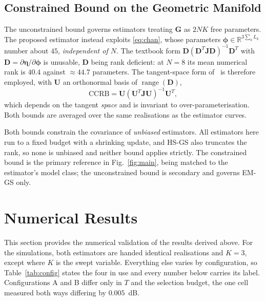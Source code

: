 \documentclass[journal]{IEEEtran}
\DeclareMathOperator{\range}{range}
\newcommand{\bG}{\mathbf{G}}
\newcommand{\bJ}{\mathbf{J}}
\newcommand{\bD}{\mathbf{D}}
\newcommand{\bU}{\mathbf{U}}
\begin{document}
\subsection{Constrained Bound on the Geometric Manifold}

The unconstrained bound governs estimators treating $\bG$ as $2NK$ free
parameters. The proposed estimator instead exploits \eqref{eq:chan}, whose
parameters $\boldsymbol\phi\in\mathbb{R}^{3\sum_k L_k}$ number about $45$,
\emph{independent of $N$}. The textbook form $\bD(\bD^T\bJ\bD)^{-1}\bD^T$ with
$\bD=\partial\boldsymbol\eta/\partial\boldsymbol\phi$ is unusable, $\bD$ being
rank deficient: at $N=8$ its mean numerical rank is $40.4$ against $\approx44.7$
parameters. The tangent-space form of~\cite{gorman1990,stoica1998} is therefore
employed, with $\bU$ an orthonormal basis of $\range(\bD)$,
\begin{equation}
\mathrm{CCRB}=\bU(\bU^T\bJ\bU)^{-1}\bU^T,
\label{eq:ccrb}
\end{equation}
which depends on the tangent \emph{space} and is invariant to
over-parameterisation. Both bounds are averaged over the same realisations as
the estimator curves.

Both bounds constrain the covariance of \emph{unbiased} estimators. All
estimators here run to a fixed budget with a shrinking update, and HS-GS also
truncates the rank, so none is unbiased and neither bound applies strictly. The
constrained bound is the primary reference in Fig.~\ref{fig:main}, being matched
to the estimator's model class; the unconstrained bound is secondary and governs
EM-GS only.

\section{Numerical Results}
\label{sec:results}

This section provides the numerical validation of the results derived above. For
the simulations, both estimators are handed identical realisations and $K=3$,
except where $K$ is the swept variable. Everything else varies by configuration,
so Table~\ref{tab:config} states the four in use and every number below carries
its label. Configurations A and B differ only in $T$ and the selection budget,
the one cell measured both ways differing by $0.005$~dB.
\end{document}
